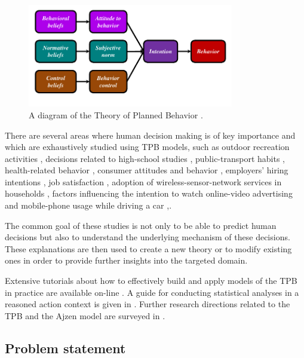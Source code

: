 \documentclass{llncs}
\begin{document}
 \begin{figure}[h!]
 \begin{center}
   \includegraphics[width=9cm]{TpbScheme.pdf}
   \caption[Fig_TPB]{A diagram of the Theory of Planned Behavior \cite{AjzenWebPage}.}
   \label{Fig_TPB}
 \end{center}
 \end{figure}
 
There are several areas where human decision making is of key importance and which are exhaustively studied using TPB models, such as outdoor recreation activities \cite{Daigle2002}, decisions related to high-school studies \cite{Davis2002}, public-transport habits \cite{Bamberg2003}, health-related behavior \cite{Ajzen2007},  consumer attitudes and behavior \cite{Ajzen2008},  employers’ hiring intentions \cite{Fraser2010}, job satisfaction \cite{IcekAjzen2011}, adoption of wireless-sensor-network services in households \cite{Lin2011}, factors influencing the intention to watch online-video advertising \cite{Lee2011} and mobile-phone usage while driving a car \cite{Walsh2008},\cite{Zhou2012}. 

The common goal of these studies is not only to be able to predict human decisions but also to understand the underlying mechanism of these decisions. These explanations are then used to create a new theory or to modify existing ones in order to provide further insights into the targeted domain.

Extensive tutorials about how to effectively build and apply models of the TPB in practice are available on-line \cite{AjzenWebPage}.  A guide for conducting statistical analyses in a reasoned action context is given in \cite{Bleakley2012}. Further research directions related to the TPB and the Ajzen model are surveyed in \cite{Jaccard2012}.




\subsection{Problem statement}\label{SubSec_}
\end{document}
